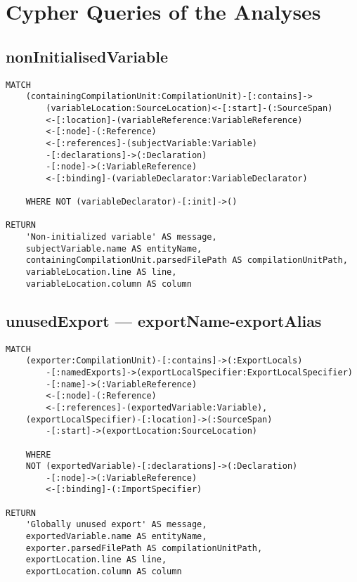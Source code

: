 \newpage
\section{Cypher Queries of the Analyses}

\subsection{nonInitialisedVariable}
\begin{lstlisting}[language=Cypher]
MATCH
    (containingCompilationUnit:CompilationUnit)-[:contains]->
        (variableLocation:SourceLocation)<-[:start]-(:SourceSpan)
        <-[:location]-(variableReference:VariableReference)
        <-[:node]-(:Reference)
        <-[:references]-(subjectVariable:Variable)
        -[:declarations]->(:Declaration)
        -[:node]->(:VariableReference)
        <-[:binding]-(variableDeclarator:VariableDeclarator)

    WHERE NOT (variableDeclarator)-[:init]->()

RETURN
    'Non-initialized variable' AS message,
    subjectVariable.name AS entityName,
    containingCompilationUnit.parsedFilePath AS compilationUnitPath,
    variableLocation.line AS line,
    variableLocation.column AS column
\end{lstlisting}


\newpage
\subsection{unusedExport — exportName-exportAlias}
\begin{lstlisting}[language=Cypher]
MATCH
    (exporter:CompilationUnit)-[:contains]->(:ExportLocals)
        -[:namedExports]->(exportLocalSpecifier:ExportLocalSpecifier)
        -[:name]->(:VariableReference)
        <-[:node]-(:Reference)
        <-[:references]-(exportedVariable:Variable),
    (exportLocalSpecifier)-[:location]->(:SourceSpan)
        -[:start]->(exportLocation:SourceLocation)

    WHERE
    NOT (exportedVariable)-[:declarations]->(:Declaration)
        -[:node]->(:VariableReference)
        <-[:binding]-(:ImportSpecifier)

RETURN
    'Globally unused export' AS message,
    exportedVariable.name AS entityName,
    exporter.parsedFilePath AS compilationUnitPath,
    exportLocation.line AS line,
    exportLocation.column AS column
\end{lstlisting}


\newpage
